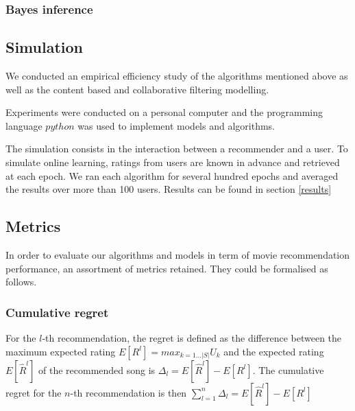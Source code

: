 \documentclass[letterpaper]{article}
\begin{document}

\subsubsection{Bayes inference}


\subsection{Simulation}

We conducted an empirical efficiency study of the algorithms mentioned above as well as the content based and collaborative filtering modelling.

Experiments were conducted on a personal computer and the programming language $python$ was used to implement models and algorithms.

The simulation consists in the interaction between a recommender and a user. To simulate online learning, ratings from users are known in advance and retrieved at each epoch. 
We ran each algorithm for several hundred epochs and averaged the results over more than 100 users. Results can be found in section \ref{results} 

\subsection{Metrics} \label{metrics}

In order to evaluate our algorithms and models in term of movie recommendation performance, an assortment of metrics retained. They could be formalised as follows.

\subsubsection{Cumulative regret}

For the $l$-th recommendation, the regret is defined as the difference between the maximum expected rating $ E[R^{l}] = max_{k=1...|S|} U_{k} $  and the expected rating $E[\hat R^{l}]$ of the recommended song is  $\Delta_{l} = E[\hat{R} ^{l}] - E[R^{l}]$. The cumulative regret for the $n$-th recommendation is then $ \sum_{l=1}^{n} \Delta_{l} = E[\hat{R} ^{l}] - E[R^{l}]$
\end{document}
